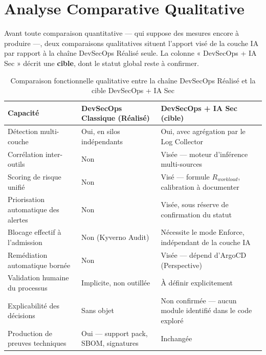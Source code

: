 
\section{Analyse Comparative Qualitative}

Avant toute comparaison quantitative — qui suppose des mesures encore à produire —, deux comparaisons qualitatives situent l'apport visé de la couche IA par rapport à la chaîne DevSecOps Réalisé seule. La colonne « DevSecOps + IA Sec » décrit une \textbf{cible}, dont le statut global reste à confirmer.

\begin{table}[htbp]
\centering
\scriptsize
\begin{tabular}{@{}p{4.4cm}p{4.8cm}p{4.8cm}@{}}
\toprule
\textbf{Capacité} & \textbf{DevSecOps Classique (Réalisé)} & \textbf{DevSecOps + IA Sec (cible)} \\
\midrule
Détection multi-couche & Oui, en silos indépendants & Oui, avec agrégation par le Log Collector \\
Corrélation inter-outils & Non & Visée — moteur d'inférence multi-sources \\
Scoring de risque unifié & Non & Visé — formule $R_{workload}$, calibration à documenter \\
Priorisation automatique des alertes & Non & Visée, sous réserve de confirmation du statut \\
Blocage effectif à l'admission & Non (Kyverno Audit) & Nécessite le mode Enforce, indépendant de la couche IA \\
Remédiation automatique bornée & Non & Visée — dépend d'ArgoCD (Perspective) \\
Validation humaine du processus & Implicite, non outillée & À définir explicitement \\
Explicabilité des décisions & Sans objet & Non confirmée — aucun module identifié dans le code exploré \\
Production de preuves techniques & Oui — support pack, SBOM, signatures & Inchangée \\
\bottomrule
\end{tabular}
\caption{Comparaison fonctionnelle qualitative entre la chaîne DevSecOps Réalisé et la cible DevSecOps + IA Sec}
\label{tab:comparaison_qualitative}
\end{table}

